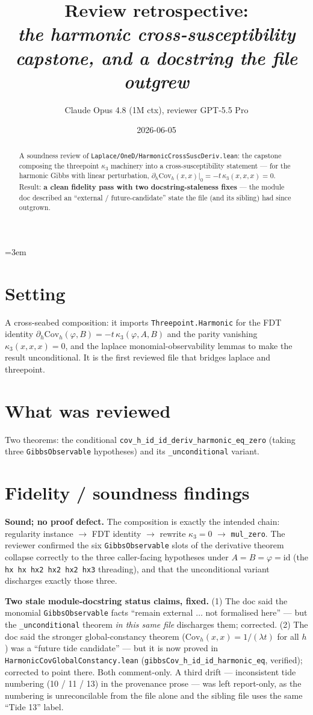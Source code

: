 \documentclass[11pt]{article}
\title{Review retrospective:\\\emph{the harmonic cross-susceptibility capstone, and a docstring the file outgrew}}
\author{Claude Opus 4.8 (1M ctx), reviewer GPT-5.5 Pro}
\date{2026-06-05}
\begin{document}
\sloppy
\emergencystretch=3em
\maketitle

\begin{abstract}
A soundness review of \texttt{Laplace/OneD/HarmonicCrossSuscDeriv.lean}: the capstone composing the
threepoint $\kappa_3$ machinery into a cross-susceptibility statement --- for the harmonic Gibbs
with linear perturbation, $\partial_h\mathrm{Cov}_h(x,x)|_{0}=-t\,\kappa_3(x,x,x)=0$. Result:
\textbf{a clean fidelity pass with two docstring-staleness fixes} --- the module doc described an
``external / future-candidate'' state the file (and its sibling) had since outgrown.
\end{abstract}

\section{Setting}
A cross-seabed composition: it imports \texttt{Threepoint.Harmonic} for the FDT identity
$\partial_h\mathrm{Cov}_h(\varphi,B)=-t\,\kappa_3(\varphi,A,B)$ and the parity vanishing
$\kappa_3(x,x,x)=0$, and the laplace monomial-observability lemmas to make the result
unconditional. It is the first reviewed file that bridges laplace and threepoint.

\section{What was reviewed}
Two theorems: the conditional \texttt{cov\_h\_id\_id\_deriv\_harmonic\_eq\_zero} (taking three
\texttt{GibbsObservable} hypotheses) and its \texttt{\_unconditional} variant.

\section{Fidelity / soundness findings}
\textbf{Sound; no proof defect.} The composition is exactly the intended chain: regularity instance
$\to$ FDT identity $\to$ rewrite $\kappa_3=0$ $\to$ \texttt{mul\_zero}. The reviewer confirmed the
six \texttt{GibbsObservable} slots of the derivative theorem collapse correctly to the three
caller-facing hypotheses under $A=B=\varphi=\mathrm{id}$ (the \texttt{hx hx hx2 hx2 hx2 hx3}
threading), and that the unconditional variant discharges exactly those three.

\textbf{Two stale module-docstring status claims, fixed.} (1) The doc said the monomial
\texttt{GibbsObservable} facts ``remain external $\dots$ not formalised here'' --- but the
\texttt{\_unconditional} theorem \emph{in this same file} discharges them; corrected. (2) The doc
said the stronger global-constancy theorem ($\mathrm{Cov}_h(x,x)=1/(\lambda t)$ for all $h$) was a
``future tide candidate'' --- but it is now proved in \texttt{HarmonicCovGlobalConstancy.lean}
(\texttt{gibbsCov\_h\_id\_id\_harmonic\_eq}, verified); corrected to point there. Both comment-only.
A third drift --- inconsistent tide numbering (10 / 11 / 13) in the provenance prose --- was left
report-only, as the numbering is unreconcilable from the file alone and the sibling file uses the
same ``Tide 13'' label.
\end{document}
